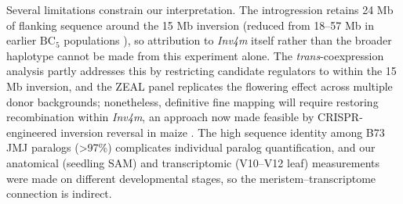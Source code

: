 \documentclass[9pt,twocolumn,twoside]{rilabRxiv}
\newcommand{\mex}{\textit{mexicana}\xspace}
\newcommand{\invfour}{\textit{Inv4m}\xspace}
\begin{document}
Several limitations constrain our interpretation.
The introgression retains 24 Mb of flanking sequence around the 15 Mb inversion (reduced from 18--57 Mb in earlier $\text{BC}_5$ populations \citep{crow2020}), so attribution to \invfour itself rather than the broader haplotype cannot be made from this experiment alone.
The \textit{trans}-coexpression analysis partly addresses this by restricting candidate regulators to within the 15 Mb inversion, and the ZEAL panel replicates the flowering effect across multiple donor backgrounds; nonetheless, definitive fine mapping will require restoring recombination within \invfour, an approach now made feasible by CRISPR-engineered inversion reversal in maize \citep{Schwartz2020-el}.
The high sequence identity among B73 JMJ paralogs (>97\%) complicates individual paralog quantification, and our anatomical (seedling SAM) and transcriptomic (V10--V12 leaf) measurements were made on different developmental stages, so the meristem--transcriptome connection is indirect.
\end{document}

